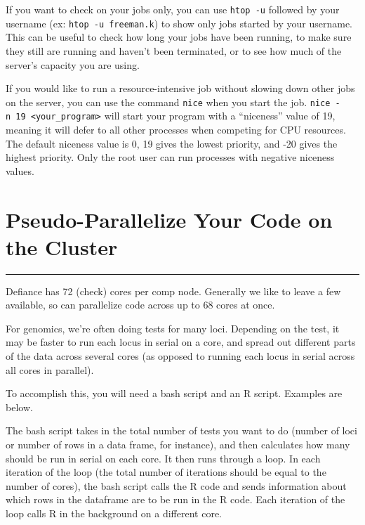 \documentclass[
  letterpaper,
  DIV=11,
  numbers=noendperiod]{scrreprt}
\begin{document}
If you want to check on your jobs only, you can use \texttt{htop\ -u}
followed by your username (ex: \texttt{htop\ -u\ freeman.k}) to show
only jobs started by your username. This can be useful to check how long
your jobs have been running, to make sure they still are running and
haven't been terminated, or to see how much of the server's capacity you
are using.

If you would like to run a resource-intensive job without slowing down
other jobs on the server, you can use the command \texttt{nice} when you
start the job.
\texttt{nice\ -n\ 19\ \textless{}your\_program\textgreater{}} will start
your program with a ``niceness'' value of 19, meaning it will defer to
all other processes when competing for CPU resources. The default
niceness value is 0, 19 gives the lowest priority, and -20 gives the
highest priority. Only the root user can run processes with negative
niceness values.

\hypertarget{pseudo-parallelize-your-code-on-the-cluster}{%
\chapter{Pseudo-Parallelize Your Code on the
Cluster}\label{pseudo-parallelize-your-code-on-the-cluster}}

\begin{center}\rule{0.5\linewidth}{0.5pt}\end{center}

Defiance has 72 (check) cores per comp node. Generally we like to leave
a few available, so can parallelize code across up to 68 cores at once.

For genomics, we're often doing tests for many loci. Depending on the
test, it may be faster to run each locus in serial on a core, and spread
out different parts of the data across several cores (as opposed to
running each locus in serial across all cores in parallel).

To accomplish this, you will need a bash script and an R script.
Examples are below.

The bash script takes in the total number of tests you want to do
(number of loci or number of rows in a data frame, for instance), and
then calculates how many should be run in serial on each core. It then
runs through a loop. In each iteration of the loop (the total number of
iterations should be equal to the number of cores), the bash script
calls the R code and sends information about which rows in the dataframe
are to be run in the R code. Each iteration of the loop calls R in the
background on a different core.
\end{document}
